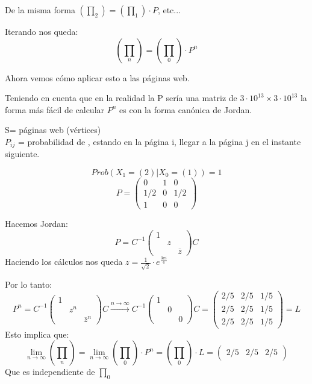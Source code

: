 De la misma forma $(\prod_2) = (\prod_1) \cdot P$, etc...

Iterando nos queda:
$$(\prod_n) = (\prod_0) \cdot P^n$$

Ahora vemos cómo aplicar esto a las páginas web.


Teniendo en cuenta que en la realidad la P sería una matriz de $3\cdot 10^{13} \times 3\cdot 10^{13}$ la forma más fácil de calcular $P^n$ es con la forma canónica de Jordan.
\begin{example}[1]{}



	\begin{center}
	\centering
\end{center}

	
	S= páginas web (vértices)\\
	$P_{ij}$ = probabilidad de , estando en la página i, llegar a la página j en el instante siguiente.

	$$Prob(X_1 = (2)| X_0 = (1)) = 1$$
	$$P =\left(\begin{matrix}
	0 & 1 & 0\\
	1/2 & 0 & 1/2\\
	1 & 0 & 0
	\end{matrix}\right)$$
	
	Hacemos Jordan:
	$$P = C^{-1} \left(\begin{matrix}
	1&&\\
	&z&\\
	&&\overline{z}
	\end{matrix}\right) C$$
	Haciendo los cálculos nos queda $z = \frac{1}{\sqrt{2}}\cdot e^{\frac{3\pi i}{4}}$
	
	Por lo tanto:
	$$P^n =  C^{-1} \left(\begin{matrix}
	1&&\\
	&z^n&\\
	&&\overline{z}^n
	\end{matrix}\right) C \stackrel{n\rightarrow \infty}{\rightarrow}  C^{-1} \left(\begin{matrix}
	1&&\\
	&0&\\
	&&0
	\end{matrix}\right) C = \left(\begin{matrix}
	2/5&2/5&1/5\\
	2/5&2/5&1/5\\
	2/5&2/5&1/5
	\end{matrix}\right) = L$$
	Esto implica que:
	$$\lim_{n\rightarrow\infty}(\prod_n) = \lim_{n\rightarrow\infty}(\prod_0)\cdot P^n = (\prod_0)\cdot L =( \begin{matrix}
	2/5&2/5&2/5
	\end{matrix})$$
	Que es independiente de $\prod_0$
\end{example}

